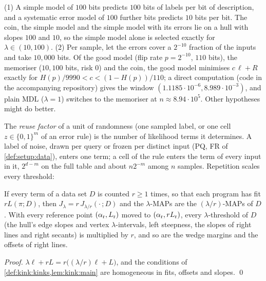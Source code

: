 \begin{remark}\label{rem:teacher:hanni}
(1) A simple model of $100$ bits predicts $100$ bits of labels per bit of description, and a systematic error model of $100$ further bits predicts $10$ bits per bit. The coin, the simple model and the simple model with its errors lie on a hull with slopes $100$ and $10$, so the simple model alone is selected exactly for $\lambda\in(10,100)$. (2) Per sample, let the errors cover a $2^{-10}$ fraction of the inputs and take $10{,}000$ bits. Of the good model (flip rate $p=2^{-10}$, $110$ bits), the memoriser ($10{,}100$ bits, risk $0$) and the coin, the good model minimises $c\,\ell+R$ exactly for $H(p)/9990<c<(1-H(p))/110$; a direct computation (code in the accompanying repository) gives the window $(1.1185\cdot10^{-6},8.989\cdot10^{-3})$, and plain MDL ($\lambda=1$) switches to the memoriser at $n\approx8.94\cdot10^5$. Other hypotheses might do better.
\end{remark}

The \emph{reuse factor} of a unit of randomness (one sampled label, or one cell $z\in\{0,1\}^m$ of an error rule) is the number of likelihood terms it determines. A label of noise, drawn per query or frozen per distinct input (PQ, FR of \cref{def:setup:data}), enters one term; a cell of the rule enters the term of every input in it, $2^{d-m}$ on the full table and about $n2^{-m}$ among $n$ samples. Repetition scales every threshold:

\begin{lemma}[Duplication]\label{lem:teacher:reuse}
If every term of a data set $D$ is counted $r\ge1$ times, so that each program has fit $rL(\pi;D)$, then $J_\lambda=r\,J_{\lambda/r}(\cdot\,;D)$ and the $\lambda$-MAPs are the $(\lambda/r)$-MAPs of $D$. With every reference point $(\alpha_{\rm r},L_{\rm r})$ moved to $(\alpha_{\rm r},rL_{\rm r})$, every $\lambda$-threshold of $D$ (the hull's edge slopes and vertex $\lambda$-intervals, left steepness, the slopes of right lines and right secants) is multiplied by $r$, and so are the wedge margins and the offsets of right lines.
\end{lemma}

\emph{Proof.} $\lambda\ell+rL=r\big((\lambda/r)\ell+L\big)$, and the conditions of \cref{def:kink:kinks,lem:kink:main} are homogeneous in fits, offsets and slopes. \qed

